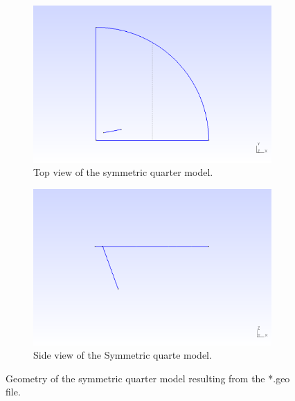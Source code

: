 \documentclass[a4]{article}
\begin{document}
\begin{figure}[tbh!]
	\centering
	\begin{subfigure}[b]{0.48\textwidth}
		\centering
		\includegraphics[width=\textwidth]{geometry_quarter1.png}
		\caption{Top view of the symmetric quarter model.}
		\label{fig:geometry_quarter1}
	\end{subfigure}
	\begin{subfigure}[b]{0.48\textwidth}
		\centering
		\includegraphics[width=\textwidth]{geometry_quarter2.png}
		\caption{Side view of the Symmetric quarte model.}
		\label{fig:geometry_quarter2}
	\end{subfigure}
	\caption{Geometry of the symmetric quarter model resulting from the *.geo file.}
\label{fig:geometry_symmetric_2x2_group}
\end{figure}
\end{document}
